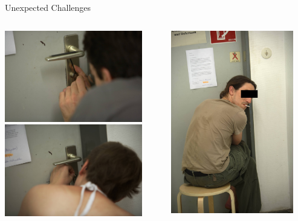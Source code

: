 \documentclass{beamer}
\begin{document}
\begin{frame}{Unexpected Challenges}
  \begin{columns}
    \begin{column}{6cm}
        \includegraphics[height=4cm]{bilder/ipick.jpg}\\
        \includegraphics[height=4cm]{bilder/lpick.jpg}
    \end{column}
    \begin{column}{6cm}
        \includegraphics[height=8cm]{bilder/apick.jpg}
    \end{column}
  \end{columns}
\end{frame}
\end{document}
